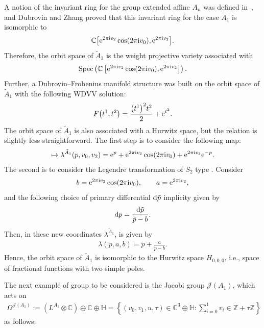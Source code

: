 \documentclass[pdftex]{sigma}%
\numberwithin{equation}{section}
\newcommand{\Ja}{\mathcal{J}}
\begin{document}
A notion of the invariant ring for the group extended affine $A_n$ was defined in~\cite{B.DubrovinandY.Zhang}, and Dubrovin and Zhang proved that this invariant ring for the case $\tilde A_1$ is isomorphic to
\begin{gather*}
\mathbb{C}\big[{\rm e}^{2\pi {\rm i} v_2}\cos(2\pi {\rm i} v_0),{\rm e}^{2\pi {\rm i} v_2}\big].
\end{gather*}
 Therefore, the orbit space of $\tilde A_1$ is the weight projective variety associated with
\begin{gather*}
 \mathop{\rm Spec}\left(\mathbb{C}\left[{\rm e}^{2\pi {\rm i} v_2}\cos(2\pi {\rm i} v_0),{\rm e}^{2\pi {\rm i} v_2}\right]\right).
\end{gather*}
 Further, a Dubrovin--Frobenius manifold structure was built on the orbit space of $\tilde A_1$ with the following WDVV solution:
\begin{gather}\label{WDVV Dub-Zhang}
F\big(t^1,t^2\big)=\frac{\big(t^1\big)^2t^2}{2}+{\rm e}^{t^2}.
\end{gather}
The orbit space of $\tilde A_1$ is also associated with a Hurwitz space, but the relation is slightly less straightforward. The first step is to consider the following map:
\begin{gather*}
[v_0,v_2]\mapsto \lambda^{\tilde A_1}(p,v_0,v_2)={\rm e}^p+{\rm e}^{2\pi {\rm i} v_2}\cos(2\pi {\rm i} v_0)+{\rm e}^{2\pi {\rm i} v_2}{\rm e}^{-p}.
\end{gather*}
The second is to consider the Legendre transformation of $S_2$ type \cite[Appendix~B and Chapter~5]{B.Dubrovin2}. Consider
\begin{gather*}
b={\rm e}^{2\pi {\rm i} v_2}\cos(2\pi {\rm i} v_0), \qquad a={\rm e}^{2\pi {\rm i}v_2},
\end{gather*}
and the following choice of primary differential ${\rm d}\tilde p$ implicity given by
\begin{gather*}
{\rm d}p=\frac{{\rm d}\tilde p}{\tilde p-b}.
\end{gather*}
Then, in these new coordinates $\lambda^{\tilde A_1}$, is given by
\begin{gather*}
\lambda(\tilde p, a,b)=\tilde p+\frac{a}{\tilde p-b}.
\end{gather*}
Hence, the orbit space of $\tilde A_1$ is isomorphic to the Hurwitz space $H_{0,0,0}$, i.e., space of fractional functions with two simple poles.

The next example of group to be considered is the Jacobi group $\Ja(A_1)$, which acts on
\begin{gather*}
\Omega^{\Ja(A_1)}:=\left(L^{A_1}\otimes\mathbb{C}\right)\oplus \mathbb{C}\oplus\mathbb{H}=\left\{(v_0,v_1,u,\tau)\in \mathbb{C}^3\oplus\mathbb{H}\colon\sum_{i=0}^1 v_i\in\mathbb{Z}+\tau\mathbb{Z} \right\}
\end{gather*}
 as follows:
\end{document}
